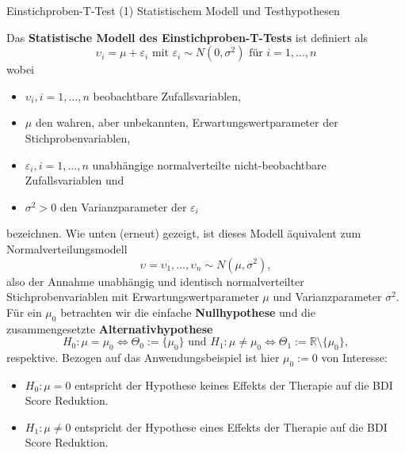 \documentclass[
  8pt,
  ignorenonframetext,
]{beamer}
\providecommand{\tightlist}{%
  \setlength{\itemsep}{0pt}\setlength{\parskip}{0pt}}
\newcommand{\ups} {\upsilon}
\begin{document}
\begin{frame}{Einstichproben-T-Test \textbar{} (1) Statistischem Modell
und Testhypothesen}
\protect\hypertarget{einstichproben-t-test-1-statistischem-modell-und-testhypothesen}{}
\vspace{2mm}
\small

Das \textbf{Statistische Modell des Einstichproben-T-Tests} ist
definiert als \begin{equation}
\ups_i = \mu + \varepsilon_i \mbox{ mit } \varepsilon_i \sim N(0,\sigma^2) \mbox{ für } i = 1,...,n
\end{equation} wobei

\begin{itemize}
\tightlist
\item
  \(\ups_i, i = 1,...,n\) beobachtbare Zufallsvariablen,
\item
  \(\mu\) den wahren, aber unbekannten, Erwartungswertparameter der
  Stichprobenvariablen,
\item
  \(\varepsilon_i, i = 1,...,n\) unabhängige normalverteilte
  nicht-beobachtbare Zufallsvariablen und
\item
  \(\sigma^2>0\) den Varianzparameter der \(\varepsilon_i\)
\end{itemize}

bezeichnen. Wie unten (erneut) gezeigt, ist dieses Modell äquivalent zum
Normalverteilungsmodell \begin{equation}
\ups = \ups_1,...,\ups_n \sim N(\mu,\sigma^2),
\end{equation} also der Annahme unabhängig und identisch
normalverteilter Stichprobenvariablen mit Erwartungswertparameter
\(\mu\) und Varianzparameter \(\sigma^2\). Für ein \(\mu_0\) betrachten
wir die einfache \textbf{Nullhypothese} und die zusammengesetzte
\textbf{Alternativhypothese} \begin{equation}
H_0 : \mu = \mu_0 \Leftrightarrow \Theta_0 := \{\mu_0\}
\mbox{ und }
H_1 : \mu \neq \mu_0 \Leftrightarrow \Theta_1 := \mathbb{R} \setminus \{\mu_0\},
\end{equation} respektive. Bezogen auf das Anwendungsbeispiel ist hier
\(\mu_0 := 0\) von Interesse:

\begin{itemize}
\tightlist
\item
  \(H_0 : \mu = 0\) entspricht der Hypothese keines Effekts der Therapie
  auf die BDI Score Reduktion.
\item
  \(H_1 : \mu \neq 0\) entspricht der Hypothese eines Effekts der
  Therapie auf die BDI Score Reduktion.
\end{itemize}
\end{frame}
\end{document}
